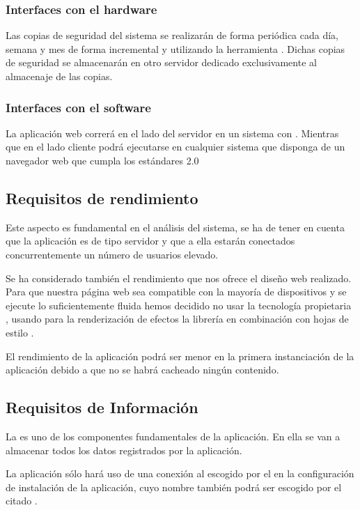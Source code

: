 \subsubsection{Interfaces con el hardware}
Las copias de seguridad del sistema se realizarán de forma periódica cada día,
semana y mes de forma incremental y utilizando la herramienta
. Dichas copias de seguridad se almacenarán en otro servidor
dedicado exclusivamente al almacenaje de las copias.

\subsubsection{Interfaces con el software}
La aplicación web correrá en el lado del servidor en un sistema  con . Mientras que en el lado cliente podrá ejecutarse en cualquier
sistema que disponga de un navegador web que cumpla los estándares 2.0 

\subsection{Requisitos de rendimiento}
Este aspecto es fundamental en el análisis del sistema, se ha de tener en cuenta
que la aplicación es de tipo servidor y que a ella estarán conectados
concurrentemente un número de usuarios elevado.

Se ha considerado también el rendimiento que nos ofrece el diseño web
realizado. Para que nuestra página web sea compatible con la mayoría de
dispositivos y se ejecute lo suficientemente fluida hemos decidido no usar la
tecnología propietaria , usando para la renderización de efectos
la librería  en combinación con hojas de estilo .

El rendimiento de la aplicación podrá ser menor en la primera instanciación de
la aplicación debido a que no se habrá cacheado ningún contenido.

\subsection{Requisitos de Información}
La  es uno de los componentes fundamentales de la
aplicación. En ella se van a almacenar todos los datos registrados por la
aplicación.

La aplicación sólo hará uso de una conexión al  escogido por el
 en la configuración de instalación de la aplicación, cuyo
nombre también podrá ser escogido por el citado .

